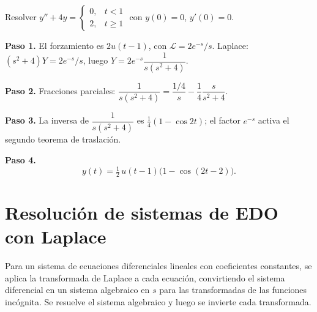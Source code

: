 \begin{example}
Resolver $y''+4y=\begin{cases}0,&t<1\\[2pt]2,&t\ge1\end{cases}$ con $y(0)=0$, $y'(0)=0$.
\begin{myproof}
\textbf{Paso 1.} El forzamiento es $2u(t-1)$, con $\mathcal{L}=2e^{-s}/s$. Laplace: $(s^2+4)Y=2e^{-s}/s$, luego $Y=2e^{-s}\dfrac{1}{s(s^2+4)}$.

\textbf{Paso 2.} Fracciones parciales: $\dfrac{1}{s(s^2+4)}=\dfrac{1/4}{s}-\dfrac{1}{4}\dfrac{s}{s^2+4}$.

\textbf{Paso 3.} La inversa de $\dfrac{1}{s(s^2+4)}$ es $\tfrac14(1-\cos 2t)$; el factor $e^{-s}$ activa el segundo teorema de traslación.

\textbf{Paso 4.}
\[
\boxed{y(t)=\tfrac12\, u(t-1)\big(1-\cos(2t-2)\big).}
\]
\end{myproof}
\end{example}

\section{Resolución de sistemas de EDO con Laplace}

\begin{rem}
Para un sistema de ecuaciones diferenciales lineales con coeficientes constantes, se aplica la transformada de Laplace a cada ecuación, convirtiendo el sistema diferencial en un sistema algebraico en $s$ para las transformadas de las funciones incógnita. Se resuelve el sistema algebraico y luego se invierte cada transformada.
\end{rem}

